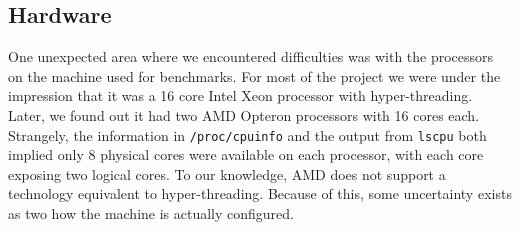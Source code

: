 \subsection{Hardware}
\label{sub:hardware}
One unexpected area where we encountered difficulties was with the processors
on the machine used for benchmarks. For most of the project we were under the
impression that it was a 16 core Intel Xeon processor with hyper-threading.
Later, we found out it had two AMD Opteron processors with 16 cores each.
Strangely, the information in \texttt{/proc/cpuinfo} and the output from
\texttt{lscpu} both implied only 8 physical cores were available on each
processor, with each core exposing two logical cores. To our knowledge, AMD
does not support a technology equivalent to hyper-threading. Because of this,
some uncertainty exists as two how the machine is actually configured.
